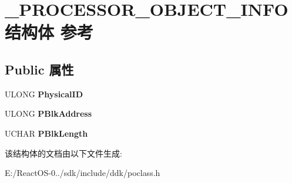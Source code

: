 \hypertarget{struct___p_r_o_c_e_s_s_o_r___o_b_j_e_c_t___i_n_f_o}{}\section{\+\_\+\+P\+R\+O\+C\+E\+S\+S\+O\+R\+\_\+\+O\+B\+J\+E\+C\+T\+\_\+\+I\+N\+F\+O结构体 参考}
\label{struct___p_r_o_c_e_s_s_o_r___o_b_j_e_c_t___i_n_f_o}
\subsection*{Public 属性}
\begin{DoxyCompactItemize}
\item 
\mbox{\label{struct___p_r_o_c_e_s_s_o_r___o_b_j_e_c_t___i_n_f_o_a82bdcc70245fe8c7f068460da0651ee4}} 
U\+L\+O\+NG {\bfseries Physical\+ID}
\item 
\mbox{\label{struct___p_r_o_c_e_s_s_o_r___o_b_j_e_c_t___i_n_f_o_a431e76dbed85003a3f34069e2a5cc2c7}} 
U\+L\+O\+NG {\bfseries P\+Blk\+Address}
\item 
\mbox{\label{struct___p_r_o_c_e_s_s_o_r___o_b_j_e_c_t___i_n_f_o_ae4c68425576d17f0b17eb68926c28c16}} 
U\+C\+H\+AR {\bfseries P\+Blk\+Length}
\end{DoxyCompactItemize}


该结构体的文档由以下文件生成\+:\begin{DoxyCompactItemize}
\item 
E\+:/\+React\+O\+S-\/0../sdk/include/ddk/poclass.\+h\end{DoxyCompactItemize}
